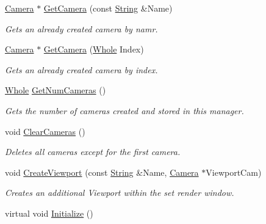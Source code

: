 \begin{DoxyCompactItemize}
\hyperlink{classphys_1_1Camera}{Camera} $\ast$ \hyperlink{classphys_1_1CameraManager_ad247bd3789c579cba5edb4c00848ac7c}{GetCamera} (const \hyperlink{namespacephys_aa03900411993de7fbfec4789bc1d392e}{String} \&Name)
\begin{DoxyCompactList}\small\item\em Gets an already created camera by namr. \item\end{DoxyCompactList}\item 
\hyperlink{classphys_1_1Camera}{Camera} $\ast$ \hyperlink{classphys_1_1CameraManager_a5147ab2269311bec15100953b7505d4b}{GetCamera} (\hyperlink{namespacephys_a460f6bc24c8dd347b05e0366ae34f34a}{Whole} Index)
\begin{DoxyCompactList}\small\item\em Gets an already created camera by index. \item\end{DoxyCompactList}\item 
\hyperlink{namespacephys_a460f6bc24c8dd347b05e0366ae34f34a}{Whole} \hyperlink{classphys_1_1CameraManager_a1a2111b4868bec403979b354395c4caf}{GetNumCameras} ()
\begin{DoxyCompactList}\small\item\em Gets the number of cameras created and stored in this manager. \item\end{DoxyCompactList}\item 
void \hyperlink{classphys_1_1CameraManager_a76bebee0820fcfa462412cb112b1b874}{ClearCameras} ()
\begin{DoxyCompactList}\small\item\em Deletes all cameras except for the first camera. \item\end{DoxyCompactList}\item 
void \hyperlink{classphys_1_1CameraManager_a99deb0e895ad703651b0ea6c933a0727}{CreateViewport} (const \hyperlink{namespacephys_aa03900411993de7fbfec4789bc1d392e}{String} \&Name, \hyperlink{classphys_1_1Camera}{Camera} $\ast$ViewportCam)
\begin{DoxyCompactList}\small\item\em Creates an additional Viewport within the set render window. \item\end{DoxyCompactList}\item 
virtual void \hyperlink{classphys_1_1CameraManager_a5e956b61fa341ae576d8d160da518488}{Initialize} ()

\end{DoxyCompactItemize}
